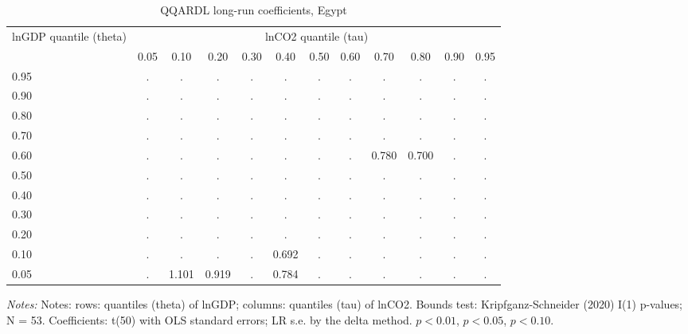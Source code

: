 \begin{table}[htbp]\centering
\caption{QQARDL long-run coefficients, Egypt}\label{tab:qqardl}
\small
\begin{tabular}{lccccccccccc}
\toprule
lnGDP quantile (theta) & \multicolumn{11}{c}{lnCO2 quantile (tau)} \\
\cmidrule(lr){2-12}
 & 0.05 & 0.10 & 0.20 & 0.30 & 0.40 & 0.50 & 0.60 & 0.70 & 0.80 & 0.90 & 0.95 \\
\midrule
0.95 & . & . & . & . & . & . & . & . & . & . & . \\
0.90 & . & . & . & . & . & . & . & . & . & . & . \\
0.80 & . & . & . & . & . & . & . & . & . & . & . \\
0.70 & . & . & . & . & . & . & . & . & . & . & . \\
0.60 & . & . & . & . & . & . & . & 0.780\sym{***} & 0.700\sym{***} & . & . \\
0.50 & . & . & . & . & . & . & . & . & . & . & . \\
0.40 & . & . & . & . & . & . & . & . & . & . & . \\
0.30 & . & . & . & . & . & . & . & . & . & . & . \\
0.20 & . & . & . & . & . & . & . & . & . & . & . \\
0.10 & . & . & . & . & 0.692\sym{***} & . & . & . & . & . & . \\
0.05 & . & 1.101\sym{***} & 0.919\sym{***} & . & 0.784\sym{***} & . & . & . & . & . & . \\
\bottomrule
\end{tabular}
\par\smallskip\begin{minipage}{0.95\linewidth}\footnotesize\textit{Notes:} Notes: rows: quantiles (theta) of lnGDP; columns: quantiles (tau) of lnCO2. Bounds test: Kripfganz-Schneider (2020) I(1) p-values; N = 53. Coefficients: t(50) with OLS standard errors; LR s.e. by the delta method. \sym{***} $p<0.01$, \sym{**} $p<0.05$, \sym{*} $p<0.10$.\end{minipage}
\end{table}